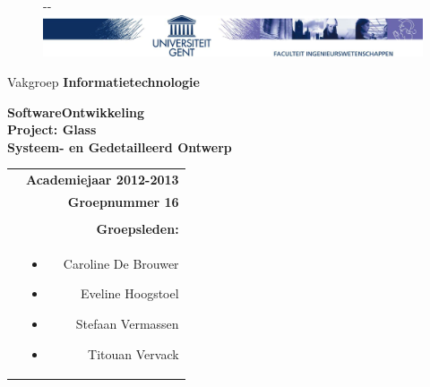 \documentclass[12pt,a4paper,oneside]{article}
\begin{document}
\begin{titlepage} 
\thispagestyle{fancy}
\fancyhf{}
\begin{figure}[!ht]
  \begin{adjustwidth}{-\oddsidemargin-1in}{-\rightmargin}
    \centering
    \includegraphics[width=\paperwidth]{banner}
  \end{adjustwidth}
\end{figure}
\vspace{-0.2em}
\hfill Vakgroep \textbf{Informatietechnologie} 
\begin{center} 
\vspace{1cm} 
\Huge \textbf{SoftwareOntwikkeling \\ Project: Glass}\\ 
\vspace{4cm}
\textbf{Systeem- en Gedetailleerd Ontwerp}\\
\vspace{6.0cm}
\normalsize
\begin{tabular}{L! {} R}
& {\bf Academiejaar 2012-2013} \\
& {\bf Groepnummer 16} \\\\
& {\bf Groepsleden:}\\
& \begin{itemize}
\item Caroline De Brouwer
\item Eveline Hoogstoel
\item Stefaan Vermassen
\item Titouan Vervack
\end{itemize} \\

\end{tabular}
 
 
\end{center} 
\end{titlepage}
\end{document}
